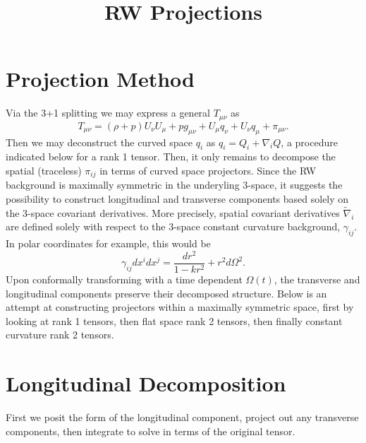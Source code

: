 \documentclass[10pt,letterpaper]{article}
\title{RW Projections}
\date{}
\begin{document}
\maketitle
\noindent 
\section*{Projection Method}
Via the 3+1 splitting we may express a general $T_{\mu\nu}$ as
\begin{equation}
T_{\mu\nu} = (\rho+p)U_\nu U_\mu + pg_{\mu\nu} +U_\mu q_\nu + U_\nu q_\mu + \pi_{\mu\nu}.
\end{equation}
Then we may deconstruct the curved space $q_i$ as $q_i = Q_i + \nabla_i Q$, a procedure indicated below for a rank 1 tensor. Then, it only remains to decompose the spatial (traceless) $\pi_{ij}$ in terms of curved space projectors. Since the RW background is maximally symmetric in the underyling 3-space, it suggests the possibility to construct longitudinal and transverse components based solely on the 3-space covariant derivatives. More precisely, spatial covariant derivatives $\tilde\nabla_i$ are defined solely with respect to the 3-space constant curvature background, $\gamma_{ij}$. In polar coordinates for example, this would be
\begin{equation}
\gamma_{ij}dx^i dx^j = \frac{dr^2}{1-kr^2}+r^2d\Omega^2.
\end{equation}
Upon conformally transforming with a time dependent $\Omega(t)$, the transverse and longitudinal components preserve their decomposed structure. Below is an attempt at constructing projectors within a maximally symmetric space, first by looking at rank 1 tensors, then flat space rank 2 tensors, then finally constant curvature rank 2 tensors.
\section*{Longitudinal Decomposition}
First we posit the form of the longitudinal component, project out any transverse components, then integrate to solve in terms of the original tensor. 
\\ 
\end{document}
